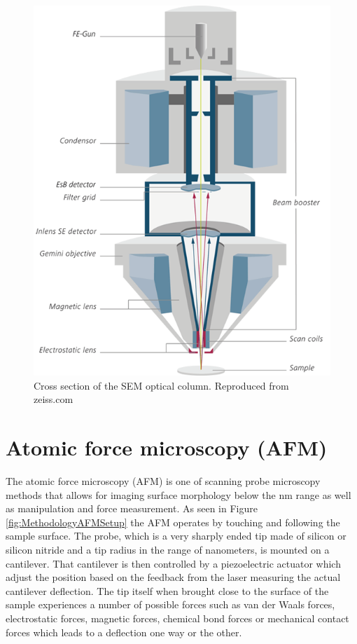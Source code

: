 \begin{figure}[!h]
	\begin{center}
		\includegraphics[scale=0.3]{Methodology/SEMSetup.png}
		\caption{Cross section of the SEM optical column. Reproduced from zeiss.com}
		\label{fig:MethodologySEMSetup}
	\end{center}
\end{figure}

\section{Atomic force microscopy (AFM)}

The atomic force microscopy (AFM) is one of scanning probe microscopy methods that allows for imaging surface morphology below the nm range as well as manipulation and force measurement. As seen in Figure \ref{fig:MethodologyAFMSetup} the AFM operates by touching and following the sample surface. The probe, which is a very sharply ended tip made of silicon or silicon nitride and a tip radius in the range of nanometers, is mounted on a cantilever. That cantilever is then controlled by a piezoelectric actuator which adjust the position based on the feedback from the laser measuring the actual cantilever deflection. The tip itself when brought close to the surface of the sample experiences a number of possible forces such as van der Waals forces, electrostatic forces, magnetic forces, chemical bond forces or mechanical contact forces which leads to a deflection one way or the other.

